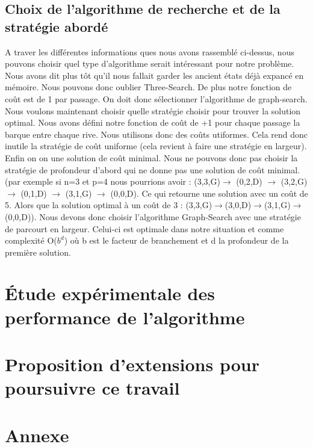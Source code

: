 \documentclass[a4paper, 12pt, french,oneside]{book}
\begin{document}
\section{Choix de l'algorithme de recherche et de la stratégie abordé}
A traver les différentes informations ques nous avons rassemblé ci-dessus, nous pouvons choisir quel type d'algorithme serait intéressant pour notre problème. Nous avons dit plus tôt qu'il nous fallait garder les ancient états déjà expancé en mémoire. Nous pouvons donc oublier Three-Search. De plus notre fonction de coût est de 1 par passage. On doit donc sélectionner l'algorithme de graph-search. Nous voulons maintenant choisir quelle stratégie choisir pour trouver la solution optimal. Nous avons défini notre fonction de coût de +1 pour chaque passage la barque entre chaque rive. Nous utilisons donc des coûts utiformes. Cela rend donc inutile la stratégie de coût uniforme (cela revient à faire une stratégie en largeur). Enfin on on une solution de coût minimal. Nous ne pouvons donc pas choisir la stratégie de profondeur d'abord qui ne donne pas une solution de coût minimal. (par exemple si n=3 et p=4 nous pourrions avoir : (3,3,G)$\rightarrow$ (0,2,D) $\rightarrow$ (3,2,G) $\rightarrow$ (0,1,D) $\rightarrow$ (3,1,G) $\rightarrow$ (0,0,D). Ce qui retourne une solution avec un coût de 5. Alors que la solution optimal à un coût de 3 : (3,3,G)$\rightarrow$(3,0,D)$\rightarrow$(3,1,G)$\rightarrow$(0,0,D)). Nous devons donc choisir l'algorithme Graph-Search avec une stratégie de parcourt en largeur. Celui-ci est optimale dans notre situation et comme complexité O($b^d$) où b est le facteur de branchement et d la profondeur de la première solution.

\chapter{Étude expérimentale des performance de l'algorithme}

\chapter{Proposition d'extensions pour poursuivre ce travail}


\appendix
\chapter{Annexe}
\end{document}
